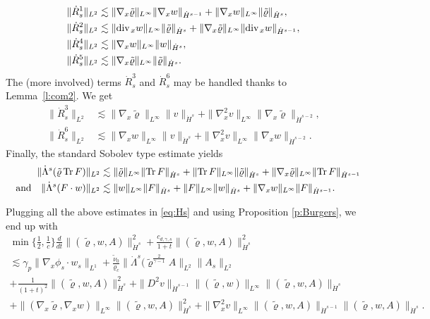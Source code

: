 \documentclass[11pt,twoside]{amsart}
\newcommand{\tildrho}{\tilde{\varrho}}
\renewcommand{\div}{\mbox{\rm div}\;\!}
\newcommand{\andf}{\quad\hbox{and}\quad}
\begin{document}
$$\begin{aligned}
\|\dot R^1_s\|_{L^2}&\lesssim \|\nabla_x\tildrho\|_{L^\infty}\|\nabla_x w\|_{\dot H^{s-1}}+\|\nabla_x w\|_{L^\infty}\|\tildrho\|_{\dot H^{s}},\\
\|\dot R_s^2\|_{L^2}&\lesssim \|\div_x w\|_{L^\infty}\|\tildrho\|_{\dot H^{s}}+\|\nabla_x \tildrho\|_{L^\infty}\|\div_x w\|_{\dot H^{s-1}},\\
\|\dot R_s^4\|_{L^2}&\lesssim \|\nabla_x w\|_{L^\infty}\|w\|_{\dot H^{s}},\\
\|\dot R_s^5\|_{L^2}&\lesssim \|\nabla_x\tildrho\|_{L^\infty}\|\tildrho\|_{\dot H^{s}}.\end{aligned}$$
The (more involved) terms $\dot R_s^3$ and $\dot R_s^6$  may be handled thanks to  Lemma~\ref{l:com2}.
We get
$$\begin{aligned}\|\dot R_s^3\|_{L^2}
&\lesssim \|\nabla_x\tildrho\|_{L^\infty}\|v\|_{\dot H^{s}}+\|\nabla_x^2v\|_{L^\infty}\|\nabla_x\tildrho\|_{\dot H^{s-2}},\\
\|\dot R_s^6\|_{L^2}&\lesssim \|\nabla_x w\|_{L^\infty}\|v\|_{\dot H^{s}}+\|\nabla_x^2v\|_{L^\infty}\|\nabla_x w\|_{\dot H^{s-2}}.\end{aligned}$$
Finally, the standard Sobolev type estimate yields 
$$\begin{aligned}
\|\dot\Lambda^s(\tildrho \, {\rm Tr}\, F)\|_{L^2}
&\lesssim\|\tildrho\|_{L^\infty}\|{\rm Tr}\, F\|_{\dot H^{s}} + \|{\rm Tr}\, F\|_{L^\infty}\|\tildrho\|_{\dot H^s} + \|\nabla_x \tildrho \|_{L^\infty} \|{\rm Tr} \, F\|_{\dot H^{s-1}}
\\
\andf 
\|\dot\Lambda^s(F\cdot w)\|_{L^2}&
\lesssim\|w\|_{L^\infty}\|F\|_{\dot H^{s}} + 
\|F\|_{L^\infty} \|w\|_{\dot H^s} + \|\nabla_x w\|_{L^\infty} \|F\|_{\dot H^{s-1}} . 
\end{aligned}
$$

Plugging all the above estimates in \eqref{eq:Hs} and using Proposition \ref{p:Burgers},   we end up with 
\begin{multline}\label{eq:Hs2}
\min\Big\{\frac12,\frac1c \Big\}\frac d{dt}\|(\tildrho,w,A)\|_{\dot H^s}^2+\frac{c_{d,\gamma,s}}{1+t}\|(\tildrho,w,A)\|_{\dot H^s}^2 \\
\lesssim
\gamma_p\|\nabla_x\phi_s\cdot w_s\|_{L^1}\!
+\frac{\tilde \nu_0}{\varrho_c}\|\dot\Lambda^s(\tildrho^{\frac{2}{\gamma-1}} A\|_{L^2}\|A_s\|_{L^2}\\+\frac{1}{(1+t)^2}\|(\tildrho,w,A)\|_{\dot H^s}^2
+\|D^2v\|_{\dot H^{s-1}}\|(\tildrho,w)\|_{L^\infty}\|(\tildrho,w,A)\|_{\dot H^s}
\\+\|(\nabla_x\tildrho,\nabla_x w)\|_{L^\infty}\|(\tildrho,w,A)\|_{\dot H^s}^2+\|\nabla^2_xv\|_{L^\infty}\|(\tildrho,w,A)\|_{\dot H^{s-1}}
\|(\tildrho,w,A)\|_{\dot H^s}.\end{multline}
\end{document}
